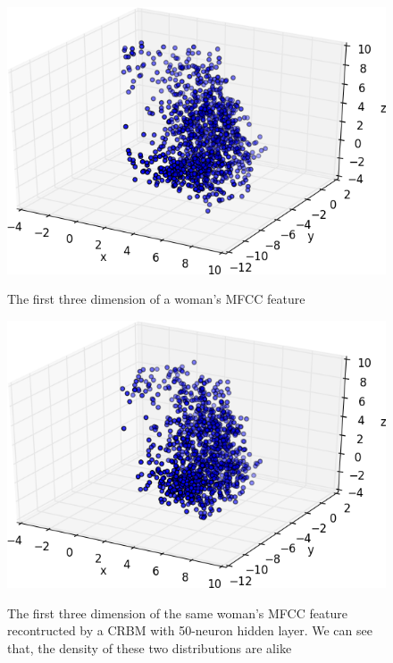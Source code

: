 \begin{figure}[H]
  \begin{minipage}{0.48\linewidth}
    \centering
    \includegraphics[width=\linewidth]{img/rbm-original.png}
    \caption*{The first three dimension of a woman's MFCC feature}
  \end{minipage}
  \hfill
  \begin{minipage}{0.48\linewidth}
    \centering
    \includegraphics[width=\linewidth]{img/rbm-reconstruct.png}
    \caption*{The first three dimension of the same woman's MFCC feature
      recontructed by a CRBM with 50-neuron hidden layer. We can
      see that, the density of these two distributions are alike}
  \end{minipage}
  \caption{\label{fig:crbm}}
\end{figure}


